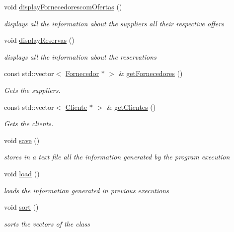 \begin{DoxyCompactItemize}
void \hyperlink{classEmpresa_aa47e9a64800a41180b7f374b73a1f32b}{display\+Fornecedorescom\+Ofertas} ()
\begin{DoxyCompactList}\small\item\em displays all the information about the suppliers all their respective offers \end{DoxyCompactList}\item 
void \hyperlink{classEmpresa_a8c89e6053eaccf0e1938a4f2ab0bfdc4}{display\+Reservas} ()
\begin{DoxyCompactList}\small\item\em displays all the information about the reservations \end{DoxyCompactList}\item 
const std\+::vector$<$ \hyperlink{classFornecedor}{Fornecedor} $\ast$ $>$ \& \hyperlink{classEmpresa_aaf131a375aa70819205744328a4dbc07}{get\+Fornecedores} ()
\begin{DoxyCompactList}\small\item\em Gets the suppliers. \end{DoxyCompactList}\item 
const std\+::vector$<$ \hyperlink{classCliente}{Cliente} $\ast$ $>$ \& \hyperlink{classEmpresa_a472beae89ee1187e1ec3f70e9d4a99ef}{get\+Clientes} ()
\begin{DoxyCompactList}\small\item\em Gets the clients. \end{DoxyCompactList}\item 
void \hyperlink{classEmpresa_afbde694da902870437443de43dae8071}{save} ()
\begin{DoxyCompactList}\small\item\em stores in a text file all the information generated by the program execution \end{DoxyCompactList}\item 
void \hyperlink{classEmpresa_a3445c3c507b4f45d1d7831908ff4cdf1}{load} ()
\begin{DoxyCompactList}\small\item\em loads the information generated in previous executions \end{DoxyCompactList}\item 
void \hyperlink{classEmpresa_aa7424cde3bdf1b1921967bc176d0ab50}{sort} ()
\begin{DoxyCompactList}\small\item\em sorts the vectors of the class \end{DoxyCompactList}\item 

\end{DoxyCompactItemize}
